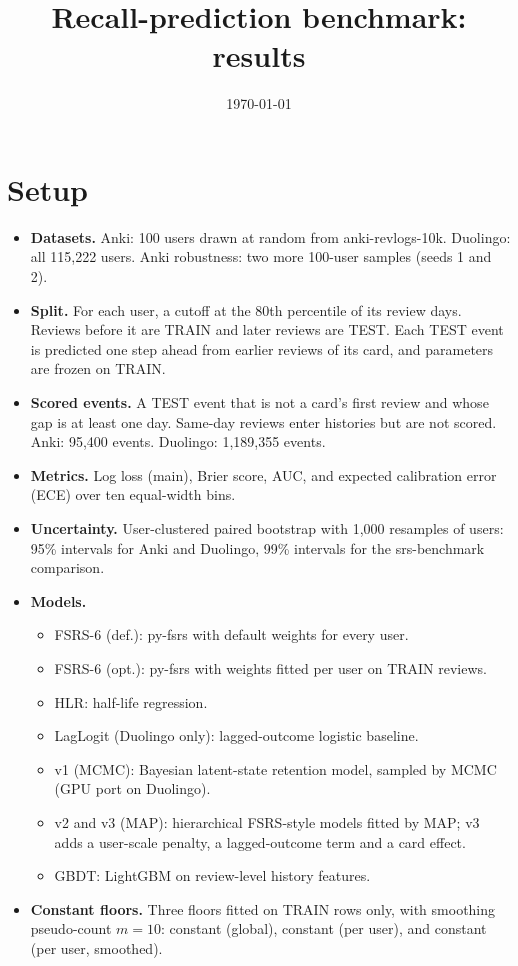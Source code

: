 \documentclass[a4paper,11pt]{article}
\title{Recall-prediction benchmark: results}
\author{}
\date{\today}
\begin{document}
\maketitle

\section{Setup}
\begin{itemize}
\item \textbf{Datasets.} Anki: 100 users drawn at random from anki-revlogs-10k. Duolingo: all 115,222 users. Anki robustness: two more 100-user samples (seeds 1 and 2).
\item \textbf{Split.} For each user, a cutoff at the 80th percentile of its review days. Reviews before it are TRAIN and later reviews are TEST. Each TEST event is predicted one step ahead from earlier reviews of its card, and parameters are frozen on TRAIN.
\item \textbf{Scored events.} A TEST event that is not a card's first review and whose gap is at least one day. Same-day reviews enter histories but are not scored. Anki: 95,400 events. Duolingo: 1,189,355 events.
\item \textbf{Metrics.} Log loss (main), Brier score, AUC, and expected calibration error (ECE) over ten equal-width bins.
\item \textbf{Uncertainty.} User-clustered paired bootstrap with 1,000 resamples of users: 95\% intervals for Anki and Duolingo, 99\% intervals for the srs-benchmark comparison.
\item \textbf{Models.}
  \begin{itemize}
  \item FSRS-6 (def.): py-fsrs with default weights for every user.
  \item FSRS-6 (opt.): py-fsrs with weights fitted per user on TRAIN reviews.
  \item HLR: half-life regression.
  \item LagLogit (Duolingo only): lagged-outcome logistic baseline.
  \item v1 (MCMC): Bayesian latent-state retention model, sampled by MCMC (GPU port on Duolingo).
  \item v2 and v3 (MAP): hierarchical FSRS-style models fitted by MAP; v3 adds a user-scale penalty, a lagged-outcome term and a card effect.
  \item GBDT: LightGBM on review-level history features.
  \end{itemize}
\item \textbf{Constant floors.} Three floors fitted on TRAIN rows only, with smoothing pseudo-count $m = 10$: constant (global), constant (per user), and constant (per user, smoothed).
\end{itemize}
\end{document}
